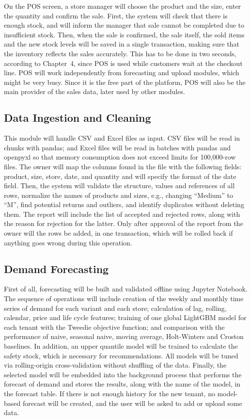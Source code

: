 \documentclass{StockSense}
\begin{document}
On the POS screen, a store manager will choose the product and the size, enter the quantity and confirm the sale. First, the system will check that there is enough stock, and will inform the manager that sale cannot be completed due to insufficient stock. Then, when the sale is confirmed, the sale itself, the sold items and the new stock levels will be saved in a single transaction, making sure that the inventory reflects the sales accurately. This has to be done in two seconds, according to Chapter~4, since POS is used while customers wait at the checkout line. POS will work independently from forecasting and upload modules, which might be very busy. Since it is the free part of the platform, POS will also be the main provider of the sales data, later used by other modules.

\subsection{Data Ingestion and Cleaning}

This module will handle CSV and Excel files as input. CSV files will be read in chunks with pandas; and Excel files will be read in batches with pandas and openpyxl so that memory consumption does not exceed limits for 100,000-row files. The owner will map the columns found in the file with the following fields: product, size, store, date, and quantity and will specify the format of the date field. Then, the system will validate the structure, values and references of all rows, normalize the names of products and sizes, e.g., changing ``Medium'' to ``M'', find potential returns and outliers, and identify duplicates without deleting them. The report will include the list of accepted and rejected rows, along with the reason for rejection for the latter. Only after approval of the report from the owner will the rows be added, in one transaction, which will be rolled back if anything goes wrong during this operation.

\subsection{Demand Forecasting}

First of all, forecasting will be built and validated offline using Jupyter Notebook. The sequence of operations will include creation of the weekly and monthly time series of demand for each variant and each store; calculation of lag, rolling, calendar, price and life cycle features; training of one global LightGBM model for each tenant with the Tweedie objective function; and comparison with the performance of naive, seasonal naive, moving average, Holt-Winters and Croston baselines. In addition, an upper quantile model will be trained to calculate the safety stock, which is necessary for recommendations. All models will be tuned via rolling-origin cross-validation without shuffling of the data. Finally, the selected model will be embedded into the background process that performs the forecast of demand and stores the results, along with the name of the model, in the forecast table. If there is not enough history for the new tenant, no model-based forecast will be created, and the user will be asked to add or upload some data.
\end{document}
